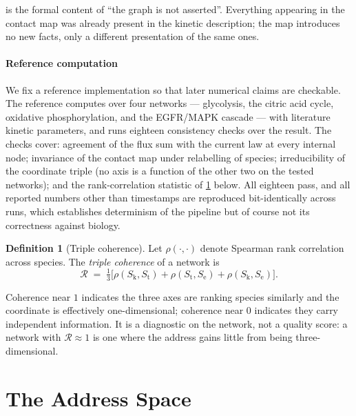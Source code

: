 \documentclass[11pt,twocolumn,a4paper]{article}
\theoremstyle{plain}
\theoremstyle{definition}
\newtheorem{definition}[theorem]{Definition}
\theoremstyle{remark}
\newcommand{\Sk}{S_{\mathrm{k}}}
\newcommand{\St}{S_{\mathrm{t}}}
\newcommand{\Se}{S_{\mathrm{e}}}
\begin{document}
 is the formal content of ``the graph is not
asserted''. Everything appearing in the contact map was already present in the
kinetic description; the map introduces no new facts, only a different
presentation of the same ones.

\subsection{Reference computation}
\label{sec:reference}

We fix a reference implementation so that later numerical claims are checkable.
The reference computes  over four networks ---
glycolysis, the citric acid cycle, oxidative phosphorylation, and the
EGFR/MAPK cascade --- with literature kinetic parameters, and runs eighteen
consistency checks over the result. The checks cover: agreement of the flux sum
with the current law at every internal node; invariance of the contact map under
relabelling of species; irreducibility of the coordinate triple (no axis is a
function of the other two on the tested networks); and the rank-correlation
statistic of \cref{def:coherence} below. All eighteen pass, and all reported
numbers other than timestamps are reproduced bit-identically across runs, which
establishes determinism of the pipeline but of course not its correctness
against biology.

\begin{definition}[Triple coherence]
\label{def:coherence}
Let $\rho(\cdot,\cdot)$ denote Spearman rank correlation \citep{Spearman1904}
across species. The \emph{triple coherence} of a network is
\begin{equation}
\mathcal{R} \;=\; \tfrac{1}{3}\bigl[\rho(\Sk,\St) + \rho(\St,\Se) + \rho(\Sk,\Se)\bigr].
\end{equation}
\end{definition}

Coherence near $1$ indicates the three axes are ranking species similarly and
the coordinate is effectively one-dimensional; coherence near $0$ indicates they
carry independent information. It is a diagnostic on the network, not a quality
score: a network with $\mathcal{R}\approx 1$ is one where the address gains
little from being three-dimensional.

\part{The Address Space}
\end{document}
